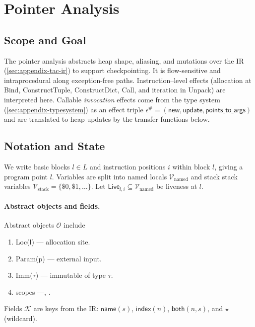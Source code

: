 \newpage
\section{Pointer Analysis}
\label{sec:appendix-pointer}

\subsection{Scope and Goal}

The pointer analysis abstracts heap shape, aliasing, and mutations over the \spytecode IR
(\autoref{sec:appendix-tac-ir}) to support checkpointing. It is
flow-sensitive and intraprocedural along exception-free paths.
Instruction–level effects (allocation at \textsf{Bind}, \textsf{ConstructTuple},
\textsf{ConstructDict}, \textsf{Call}, and iteration in \textsf{Unpack}) are interpreted here.
Callable \emph{invocation} effects come from the type system
(\autoref{sec:appendix-typesystem}) as an effect triple
\(\epsilon^\#=(\mathsf{new},\mathsf{update},\mathsf{points\_to\_args})\) and are translated to
heap updates by the transfer functions below.

\subsection{Notation and State}

We write basic blocks \(l\in L\) and instruction positions \(i\) within block \(l\), giving a
program point \(l\).
Variables are split into named locals \(\mathcal{V}_{\mathrm{named}}\) and stack stack variables
\(\mathcal{V}_{\mathrm{stack}}=\{\$0,\$1,\ldots\}\).
Let \(\mathsf{Live}_{l,i}\subseteq \mathcal{V}_{\mathrm{named}}\) be liveness at \(l\).

\paragraph{Abstract objects and fields.}
Abstract objects \(\mathcal{O}\) include
\begin{enumerate}
    \item \textsf{Loc}(l) --- allocation site.
    \item \textsf{Param}(p) --- external input.
    \item \textsf{Imm}($\tau$) --- immutable of type $\tau$.
    \item scopes ---\tLOCALS, \tGLOBALS.
\end{enumerate}

Fields \(\mathcal{K}\) are keys from the IR:
\(\mathsf{name}(s)\), \(\mathsf{index}(n)\), \(\mathsf{both}(n,s)\), and \(\star\) (wildcard).

